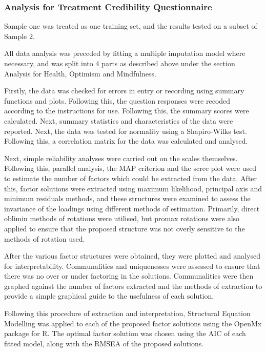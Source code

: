 \subsubsection{Analysis for Treatment Credibility Questionnaire}

Sample one was treated as one training set, and the results tested on a subset of Sample 2. 

All data analysis was preceded by fitting a multiple imputation model where necessary, and was split into 4 parts as described above under the section Analysis for Health, Optimism and Mindfulness.

Firstly, the data was checked for errors in entry or recording using summary functions and plots. Following this, the question responses were recoded according to the instructions for use. Following this, the summary scores were calculated. Next, summary statistics and characteristics of the data were reported. Next, the data was tested for normality using a Shapiro-Wilks test. Following this, a correlation matrix for the data was calculated and analysed.

Next, simple reliability analyses were carried out on the scales themselves. Following this, parallel analysis, the MAP criterion and the scree plot were used to estimate the number of factors which could be extracted from the data. After this, factor solutions were extracted using maximum likelihood, principal axis and minimum residuals methods, and these structures were examined to assess the invariance of the loadings using different methods of estimation. Primarily, direct oblimin methods of rotations were utilised, but promax rotations were also applied to ensure that the proposed structure was not overly sensitive to the methods of rotation used.

After the various factor structures were obtained, they were plotted and analysed for interpretability. Communalities and uniquenesses were assessed to ensure that there was no over or under factoring in the solutions. Communalities were then graphed against the number of factors extracted and the methods of extraction to provide a simple graphical guide to the usefulness of each solution.

Following this procedure of extraction and interpretation, Structural Equation Modelling was applied to each of the proposed factor solutions using the OpenMx package for R. The optimal factor solution was chosen using the AIC of each fitted model, along with the RMSEA of the proposed solutions.


